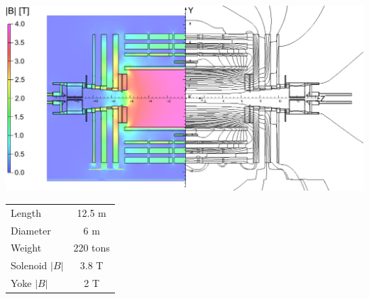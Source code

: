 \begin{minipage}{\linewidth} 
    \vspace{0.5cm}
    \hspace{-0.65cm}
    \begin{minipage}{0.63\linewidth}
        \raggedright
        \includegraphics[width=1\linewidth]{fig//chap03-cms/magnetic_field.png}
        \label{fig:magnetic_field}
    \end{minipage}
    \hspace{0.035\linewidth}
    \begin{minipage}{0.28\linewidth}
        \raggedright
        \begin{tabular}{l|c}
            \hline
            Length &  12.5 m\\
            Diameter & 6 m\\
            Weight &  220 tons\\
            Solenoid $|B|$ &  3.8 T\\
            Yoke $|B|$ & 2 T\\
            \hline
        \end{tabular}
        \vspace{0.4cm}
    \end{minipage}
\end{minipage}

